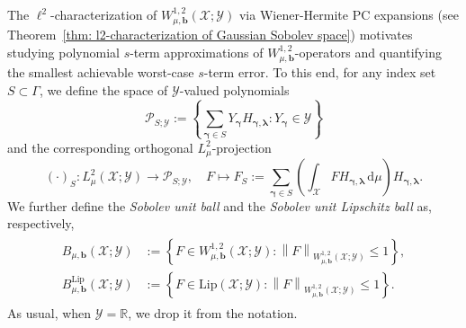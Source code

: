 \documentclass[namedate,webpdf]{ima-authoring-template-blank}
\newcommand*{\Lip}{\mathrm{Lip}}  %
\def\D{\,\mathrm{d}}
\newcommand*{\nm}[1]{{\left\|#1\right \|}}
\numberwithin{counter}{section}
\numberwithin{equation}{section}
\theoremstyle{plain}
\theoremstyle{definition}
\newcommand*{\cP}{\mathcal{P}}
\newcommand*{\cX}{\mathcal{X}}
\newcommand*{\cY}{\mathcal{Y}}
\newcommand*{\bbR}{\mathbb{R}}
\theoremstyle{thmstyletwo}
\begin{document}
The \(\ell^2\)-characterization of \(W_{\mu, \bm{b}}^{1, 2}(\cX; \cY)\) via Wiener-Hermite PC expansions (see Theorem~\ref{thm: l2-characterization of Gaussian Sobolev space}) motivates studying polynomial \(s\)-term approximations of \(W_{\mu, \bm{b}}^{1, 2}\)-operators and quantifying the smallest achievable worst-case \(s\)-term error.
To this end, for any index set \(S \subset \Gamma\), we define the space of \(\cY\)-valued polynomials
\[
\cP_{S; \cY} := \left \{ \sum_{\bm{\gamma} \in S} Y_{\bm{\gamma}} H_{\bm{\gamma}, \bm{\lambda}} : Y_{\bm{\gamma}} \in \cY \right \}
\]
and the corresponding orthogonal \(L_{\mu}^2\)-projection
\begin{equation}
\label{eq: L2 projection}
    (\cdot)_S: L_{\mu}^2(\cX; \cY) \to \cP_{S; \cY}, \quad F \mapsto F_S := \sum_{\bm{\gamma} \in S} \left( \int_{\cX} F H_{\bm{\gamma}, \bm{\lambda}} \D \mu \right) H_{\bm{\gamma}, \bm{\lambda}}.
\end{equation}
We further define the \emph{Sobolev unit ball} and the \emph{Sobolev unit Lipschitz ball} as, respectively,
\begin{align}
\begin{split}
\label{eq: Sobolev unit (Lipschitz) ball}
    B_{\mu, \bm{b}}(\cX; \cY)
    &:= \left\{ F \in W_{\mu, \bm{b}}^{1,2}(\cX; \cY): \nm{F}_{W_{\mu, \bm{b}}^{1,2}(\cX; \cY)} \leq 1 \right\},
    \\
    B_{\mu, \bm{b}}^{\Lip}(\cX; \cY)
    &:= \left\{ F \in \Lip(\cX; \cY): \nm{F}_{W_{\mu, \bm{b}}^{1,2}(\cX; \cY)} \leq 1 \right\}.
\end{split}
\end{align}
As usual, when \( \cY = \bbR \), we drop it from the notation.
\end{document}
